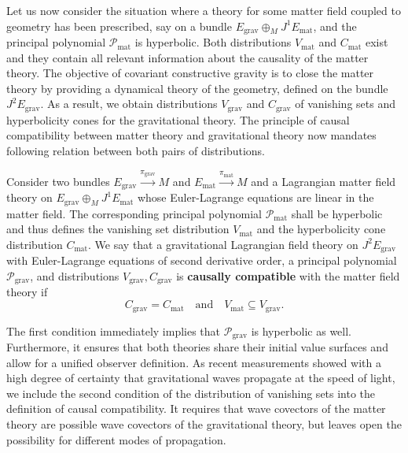 Let us now consider the situation where a theory for some matter field coupled to geometry has been prescribed, say on a bundle $E_\text{grav} \oplus_M J^1 E_\text{mat}$, and the principal polynomial $\mathcal P_\text{mat}$ is hyperbolic. Both distributions $V_\text{mat}$ and $C_\text{mat}$ exist and they contain all relevant information about the causality of the matter theory. The objective of covariant constructive gravity is to close the matter theory by providing a dynamical theory of the geometry, defined on the bundle $J^2E_\text{grav}$. As a result, we obtain distributions $V_\text{grav}$ and $C_\text{grav}$ of vanishing sets and hyperbolicity cones for the gravitational theory. The principle of causal compatibility between matter theory and gravitational theory now mandates following relation between both pairs of distributions.
\begin{definition}\label{causal_compatibility_def}
  Consider two bundles $E_\text{grav}\overset{\pi_\text{grav}}{\longrightarrow}M$ and $E_\text{mat}\overset{\pi_\text{mat}}{\longrightarrow}M$ and a Lagrangian matter field theory on $E_\text{grav} \oplus_M J^1E_\text{mat}$ whose Euler-Lagrange equations are linear in the matter field. The corresponding principal polynomial $\mathcal P_\text{mat}$ shall be hyperbolic and thus defines the vanishing set distribution $V_\text{mat}$ and the hyperbolicity cone distribution $C_\text{mat}$. We say that a gravitational Lagrangian field theory on $J^2E_\text{grav}$ with Euler-Lagrange equations of second derivative order, a principal polynomial $\mathcal P_\text{grav}$, and distributions $V_\text{grav},C_\text{grav}$ is \textbf{causally compatible} with the matter field theory if
  \begin{equation}\label{axiom2_eq}
    C_\text{grav} = C_\text{mat}\quad \text{and}\quad V_\text{mat} \subseteq V_\text{grav}.
  \end{equation}
\end{definition}
The first condition immediately implies that $\mathcal P_\text{grav}$ is hyperbolic as well. Furthermore, it ensures that both theories share their initial value surfaces and allow for a unified observer definition\cite{R_tzel_2011,Rivera_2012}. As recent measurements showed with a high degree of certainty that gravitational waves propagate at the speed of light, we include the second condition of the distribution of vanishing sets into the definition of causal compatibility. It requires that wave covectors of the matter theory are possible wave covectors of the gravitational theory, but leaves open the possibility for different modes of propagation.

